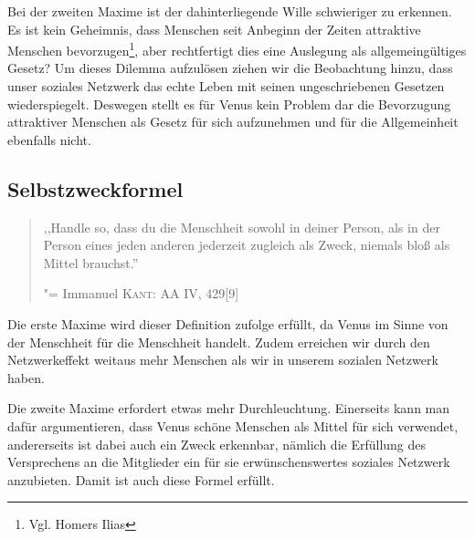 Bei der zweiten Maxime ist der dahinterliegende Wille schwieriger zu
erkennen.  Es ist kein Geheimnis, dass Menschen seit Anbeginn der
Zeiten attraktive Menschen bevorzugen\footnote{Vgl. Homers Ilias},
aber rechtfertigt dies eine Auslegung als allgemeingültiges Gesetz?
Um dieses Dilemma aufzulösen ziehen wir die Beobachtung hinzu, dass
unser soziales Netzwerk das echte Leben mit seinen ungeschriebenen
Gesetzen wiederspiegelt.  Deswegen stellt es für Venus kein Problem
dar die Bevorzugung attraktiver Menschen als Gesetz für sich
aufzunehmen und für die Allgemeinheit ebenfalls nicht.

\subsection{Selbstzweckformel}

\begin{quote}

,,Handle so, dass du die Menschheit sowohl in deiner Person, als in der Person eines jeden anderen jederzeit zugleich als Zweck, niemals bloß als Mittel brauchst.''

"= Immanuel \textsc{Kant}: AA IV, 429[9]

\end{quote}

Die erste Maxime wird dieser Definition zufolge erfüllt, da Venus im
Sinne von der Menschheit für die Menschheit handelt.  Zudem erreichen
wir durch den Netzwerkeffekt weitaus mehr Menschen als wir in unserem
sozialen Netzwerk haben.

Die zweite Maxime erfordert etwas mehr Durchleuchtung.  Einerseits
kann man dafür argumentieren, dass Venus schöne Menschen als Mittel
für sich verwendet, andererseits ist dabei auch ein Zweck erkennbar,
nämlich die Erfüllung des Versprechens an die Mitglieder ein für sie
erwünschenswertes soziales Netzwerk anzubieten.  Damit ist auch diese
Formel erfüllt.
